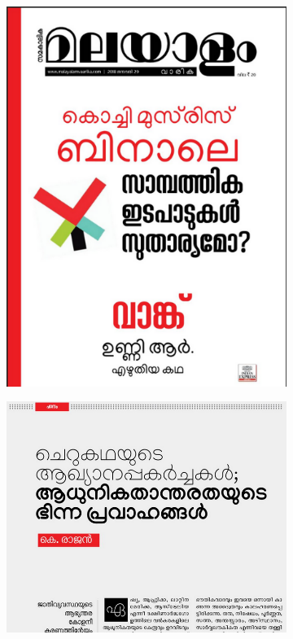 \documentclass[11pt,twoside,a4paper,parskip=half]{scrartcl}
\begin{document}
\begin{figure}[h!]
	\begin{subfigure}[b]{.45\textwidth}
		
		\includegraphics[width=\linewidth]{images/manjari-sample-3.png}
		\end{subfigure}
	\begin{subfigure}[b]{.45\textwidth}
				\includegraphics[width=\linewidth]{images/manjari-sample-2.png}
	

\end{subfigure}
\end{figure}
\end{document}
